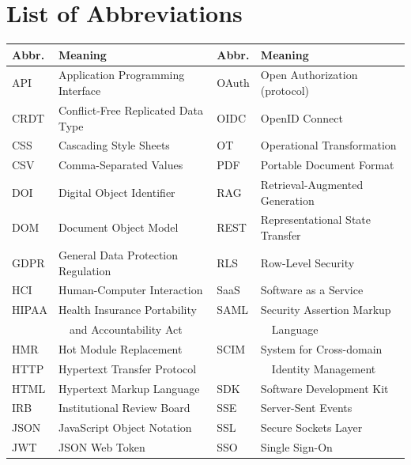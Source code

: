 \chapter*{List of Abbreviations}

\noindent
\small
\setlength{\tabcolsep}{6pt}
\renewcommand{\arraystretch}{1.15}
\begin{tabular}{@{}l p{5.6cm} l p{5.6cm}@{}}
\toprule
\textbf{Abbr.} & \textbf{Meaning} & \textbf{Abbr.} & \textbf{Meaning} \\
\midrule
API   & Application Programming Interface          & OAuth & Open Authorization (protocol) \\
CRDT  & Conflict-Free Replicated Data Type         & OIDC  & OpenID Connect \\
CSS   & Cascading Style Sheets                     & OT    & Operational Transformation \\
CSV   & Comma-Separated Values                     & PDF   & Portable Document Format \\
DOI   & Digital Object Identifier                  & RAG   & Retrieval-Augmented Generation \\
DOM   & Document Object Model                      & REST  & Representational State Transfer \\
GDPR  & General Data Protection Regulation         & RLS   & Row-Level Security \\
HCI   & Human-Computer Interaction                 & SaaS  & Software as a Service \\
HIPAA & Health Insurance Portability               & SAML  & Security Assertion Markup \\
      & ~~and Accountability Act                   &       & ~~Language \\
HMR   & Hot Module Replacement                     & SCIM  & System for Cross-domain \\
HTTP  & Hypertext Transfer Protocol                &       & ~~Identity Management \\
HTML  & Hypertext Markup Language                  & SDK   & Software Development Kit \\
IRB   & Institutional Review Board                 & SSE   & Server-Sent Events \\
JSON  & JavaScript Object Notation                 & SSL   & Secure Sockets Layer \\
JWT   & JSON Web Token                             & SSO   & Single Sign-On \\

\end{tabular}
